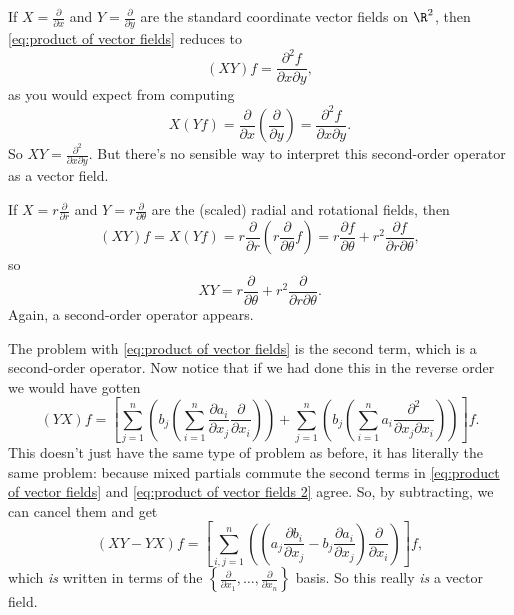 \begin{example}
	If $X = \frac{\partial}{\partial x}$ and $Y = \frac{\partial}{\partial y}$ are the standard coordinate vector fields on $\R^2$, then \eqref{eq:product of vector fields} reduces to
	\[
		(XY)f = \frac{\partial^2 f}{\partial x \partial y},
	\]
	as you would expect from computing
	\[
		X(Yf) = \frac{\partial}{\partial x} \left( \frac{\partial}{\partial y}\right) = \frac{\partial^2 f}{\partial x \partial y}.
	\]
	So $XY = \frac{\partial^2}{\partial x \partial y}$. But there's no sensible way to interpret this second-order operator as a vector field.
\end{example}

\begin{example}\label{ex:radial and rotational fields}
	If $X = r \frac{\partial}{\partial r}$ and $Y = r \frac{\partial}{\partial \theta}$ are the (scaled) radial and rotational fields, then
	\[
		(XY)f = X(Yf) = r \frac{\partial }{\partial r} \left( r \frac{\partial}{\partial \theta}f \right) = r \frac{\partial f}{\partial \theta} + r^2 \frac{\partial f}{\partial r \partial \theta},
	\]
	so
	\[
		XY = r \frac{\partial}{\partial \theta} + r^2 \frac{\partial}{\partial r \partial \theta}.
	\]
	Again, a second-order operator appears.
\end{example}

The problem with \eqref{eq:product of vector fields} is the second term, which is a second-order operator. Now notice that if we had done this in the reverse order we would have gotten
\begin{equation}\label{eq:product of vector fields 2}
	(YX)f = \left[ \sum_{j=1}^n \left(b_j \left( \sum_{i=1}^n \frac{\partial a_i}{\partial x_j} \frac{\partial}{\partial x_i}\right)\right) + \sum_{j=1}^n \left(b_j \left(\sum_{i=1}^n a_i \frac{\partial^2}{\partial x_j \partial x_i}\right)\right)\right]f.
\end{equation}
This doesn't just have the same type of problem as before, it has literally the same problem: because mixed partials commute the second terms in \eqref{eq:product of vector fields} and \eqref{eq:product of vector fields 2} agree. So, by subtracting, we can cancel them and get
\begin{equation}\label{eq:Lie bracket in local coords}
	(XY - YX)f = \left[\sum_{i,j=1}^n \left(\left( a_j \frac{\partial b_i}{\partial x_j} - b_j \frac{\partial a_i}{\partial x_j}\right)\frac{\partial}{\partial x_i}\right)\right]f,
\end{equation}
which \emph{is} written in terms of the $\left\{ \frac{\partial}{\partial x_1}, \dots , \frac{\partial}{\partial x_n}\right\}$ basis. So this really \emph{is} a vector field.

